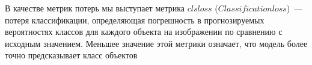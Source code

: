 В качестве метрик потерь мы выступает метрика $cls loss$ ($Classification loss$)~--- потеря классификации, определяющая погрешность в прогнозируемых вероятностях классов для каждого объекта на изображении по сравнению с исходным значением. Меньшее значение этой метрики означает, что модель более точно предсказывает класс объектов